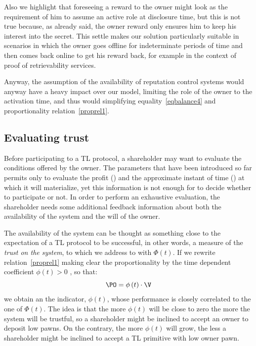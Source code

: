 Also we highlight that foreseeing a reward to the owner might look as the requirement of him to assume an active role at disclosure time, but this is not true because, as already said, the owner reward only ensures him to keep his interest into the secret. This settle makes our solution particularly suitable in scenarios in which the owner goes offline for indeterminate periods of time and then comes back online to get his reward back, for example in the context of proof of retrievability services.

Anyway, the assumption of the availability of reputation control systems would anyway have a heavy impact over our model, limiting the role of the owner to the activation time, and thus would simplifying equality~\ref{eqbalance4} and proportionality relation~\ref{proprel1}.

\subsection{Evaluating trust}

Before participating to a TL protocol, a shareholder may want to evaluate the conditions offered by the owner. The parameters that have been introduced so far permits only to evaluate the profit (\profit) and the approximate instant of time (\td) at which it will materialize, yet this information is not enough for \shareholder to decide whether to participate or not.
In order to perform an exhaustive evaluation, the shareholder needs some additional feedback information about both the availability of the system and the will of the owner. 

The availability of the system can be thought as something close to the expectation of a TL protocol to be successful, in other words, a measure of the {\em trust on the system}, to which we address to with $\Phi \left( t \right)$. 
If we rewrite relation~\ref{proprel1} making clear the proportionality by the time dependent coefficient $\phi \left( t \right) > 0$ , so that:
\begin{equation}\label{proprel2}
\PO = \phi \left( t \right) \cdot \V
\end{equation} 
we obtain an the indicator, $\phi \left( t \right)$, whose performance is closely correlated to the one of $\Phi \left( t \right)$. The idea is that the more $\phi \left( t \right)$ will be close to zero the more the system will be trustful, so a shareholder might be inclined to accept an owner to deposit low pawns. On the contrary, the more $\phi \left( t \right)$ will grow, the less a shareholder might be inclined to accept a TL primitive with low owner pawn. 

